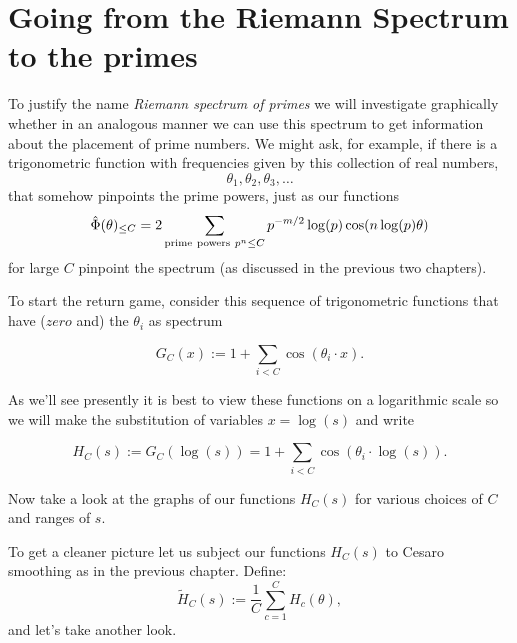 \documentclass[openany]{book}
\theoremstyle{plain}
\theoremstyle{definition}
\begin{document}
{{\chapter{Going from the Riemann Spectrum to the primes}

To justify the name {\it Riemann spectrum of primes} we will
investigate graphically whether in an analogous manner we can use this
spectrum to get information about the placement of prime numbers. We
might ask, for example, if there is a trigonometric function with
frequencies given by this collection of real
numbers, $$\theta_1,\theta_2,\theta_3,\dots$$ that somehow pinpoints
the prime powers, just as our functions $${\hat \Phi}(\theta)_{\le C}=
2\sum_{{\rm prime\ powers\ } p^n \le C}
p^{-m/2}\log(p)\cos(n\log(p)\theta)$$ for large $C$ pinpoint the
spectrum (as discussed in the previous two chapters).

  To start the return game, consider this sequence of trigonometric functions that have ($zero$ and)  the $\theta_i$ as  spectrum

   $$G_C(x):= 1+ \sum_{i < C}\cos(\theta_i\cdot x).$$

    As we'll see  presently it is best to view these functions on a logarithmic scale so we will make the substitution of variables  $x = \log(s)$ and write

    $$H_C(s):= G_C(\log(s))= 1+ \sum_{i < C}\cos(\theta_i\cdot \log(s)).$$

    Now take a look at the graphs of our functions $H_C(s)$ for various choices of $C$ and ranges of $s$.


   To get a cleaner picture let us subject our functions $H_C(s)$ to Cesaro smoothing as in the previous chapter. Define:
   $${\tilde H}_C(s) :=  {\frac{1}{C}}\sum_{c=1}^{C} H_c(\theta),$$ and let's take another look.

   }}
\end{document}

